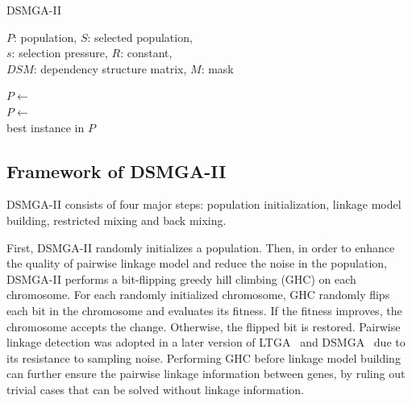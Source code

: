 \documentclass{sig-alternate-05-2015}
\begin{document}
\begin{algorithm}
\caption{DSMGA-II}\label{algo_disjdecomp}


$P$: population, $S$: selected population, \\
$s$: selection pressure, $R$: constant, \\
$DSM$: dependency structure matrix, $M$: mask \\


\BlankLine

$P \leftarrow$  \\
$P \leftarrow$  \\
\Return best instance in $P$
\end{algorithm}


\subsection{Framework of DSMGA-II}
DSMGA-II consists of four major steps: population initialization, linkage model building, restricted mixing and back mixing. 

First, DSMGA-II randomly initializes a population. Then, in order to enhance the quality of pairwise linkage model and reduce the noise in the population, DSMGA-II performs a bit-flipping greedy hill climbing (GHC) on each chromosome. For each randomly initialized chromosome, GHC randomly flips each bit in the chromosome and evaluates its fitness. If the fitness improves, the chromosome accepts the change. Otherwise, the flipped bit is restored. Pairwise linkage detection was adopted in a later version of LTGA~\cite{pelikan:pairwise} and DSMGA~\cite{yu:DSMGA} due to its resistance to sampling noise. Performing GHC before linkage model building can further ensure the pairwise linkage information between genes, by ruling out trivial cases that can be solved without linkage information. 
\end{document}
